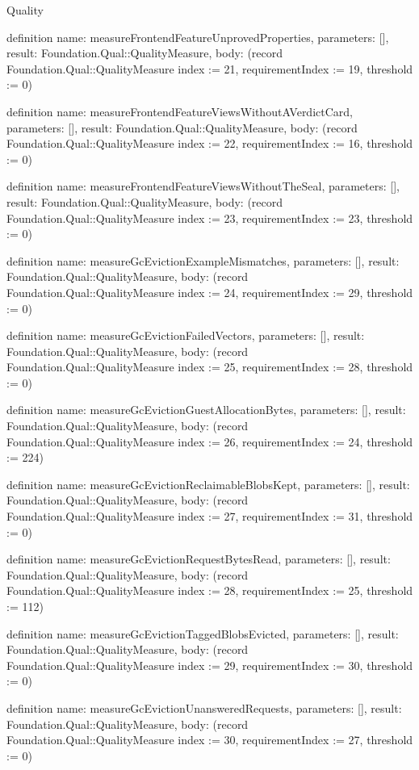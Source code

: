 \begin{lexlean}{Quality}
\begin{semanticmodule}
definition{
  name: measureFrontendFeatureUnprovedProperties,
  parameters: [],
  result: Foundation.Qual::QualityMeasure,
  body: (record Foundation.Qual::QualityMeasure {index := 21, requirementIndex := 19, threshold := 0})
}

definition{
  name: measureFrontendFeatureViewsWithoutAVerdictCard,
  parameters: [],
  result: Foundation.Qual::QualityMeasure,
  body: (record Foundation.Qual::QualityMeasure {index := 22, requirementIndex := 16, threshold := 0})
}

definition{
  name: measureFrontendFeatureViewsWithoutTheSeal,
  parameters: [],
  result: Foundation.Qual::QualityMeasure,
  body: (record Foundation.Qual::QualityMeasure {index := 23, requirementIndex := 23, threshold := 0})
}

definition{
  name: measureGcEvictionExampleMismatches,
  parameters: [],
  result: Foundation.Qual::QualityMeasure,
  body: (record Foundation.Qual::QualityMeasure {index := 24, requirementIndex := 29, threshold := 0})
}

definition{
  name: measureGcEvictionFailedVectors,
  parameters: [],
  result: Foundation.Qual::QualityMeasure,
  body: (record Foundation.Qual::QualityMeasure {index := 25, requirementIndex := 28, threshold := 0})
}

definition{
  name: measureGcEvictionGuestAllocationBytes,
  parameters: [],
  result: Foundation.Qual::QualityMeasure,
  body: (record Foundation.Qual::QualityMeasure {index := 26, requirementIndex := 24, threshold := 224})
}

definition{
  name: measureGcEvictionReclaimableBlobsKept,
  parameters: [],
  result: Foundation.Qual::QualityMeasure,
  body: (record Foundation.Qual::QualityMeasure {index := 27, requirementIndex := 31, threshold := 0})
}

definition{
  name: measureGcEvictionRequestBytesRead,
  parameters: [],
  result: Foundation.Qual::QualityMeasure,
  body: (record Foundation.Qual::QualityMeasure {index := 28, requirementIndex := 25, threshold := 112})
}

definition{
  name: measureGcEvictionTaggedBlobsEvicted,
  parameters: [],
  result: Foundation.Qual::QualityMeasure,
  body: (record Foundation.Qual::QualityMeasure {index := 29, requirementIndex := 30, threshold := 0})
}

definition{
  name: measureGcEvictionUnansweredRequests,
  parameters: [],
  result: Foundation.Qual::QualityMeasure,
  body: (record Foundation.Qual::QualityMeasure {index := 30, requirementIndex := 27, threshold := 0})
}


\end{semanticmodule}
\end{lexlean}
